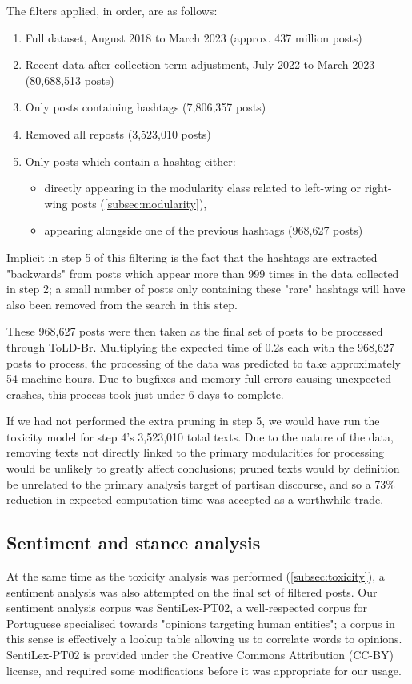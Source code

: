 \documentclass[a4paper,11pt]{article}  %
\begin{document}
	The filters applied, in order, are as follows:
	\begin{enumerate}
		\item Full dataset, August 2018 to March 2023 (approx. 437 million posts)
		\item Recent data after collection term adjustment, July 2022 to March 2023 (80,688,513 posts)
		\item Only posts containing hashtags (7,806,357 posts)
		\item Removed all reposts (3,523,010 posts)
		\item Only posts which contain a hashtag either:
		\begin{itemize}
			\item directly appearing in the modularity class related to left-wing or right-wing posts (\autoref{subsec:modularity}),
			\item appearing alongside one of the previous hashtags (968,627 posts)
		\end{itemize}
	\end{enumerate}
	Implicit in step 5 of this filtering is the fact that the hashtags are extracted "backwards" from posts which appear more than 999 times in the data collected in step 2; a small number of posts only containing these "rare" hashtags will have also been removed from the search in this step.
	
	These 968,627 posts were then taken as the final set of posts to be processed through ToLD-Br. Multiplying the expected time of 0.2s each with the 968,627 posts to process, the processing of the data was predicted to take approximately 54 machine hours. Due to bugfixes and memory-full errors causing unexpected crashes, this process took just under 6 days to complete.
	
	If we had not performed the extra pruning in step 5, we would have run the toxicity model for step 4's 3,523,010 total texts. Due to the nature of the data, removing texts not directly linked to the primary modularities for processing would be unlikely to greatly affect conclusions; pruned texts would by definition be unrelated to the primary analysis target of partisan discourse, and so a 73\% reduction in expected computation time was accepted as a worthwhile trade.

	\subsection{Sentiment and stance analysis}
	\label{subsec:sentiment}
	At the same time as the toxicity analysis was performed (\autoref{subsec:toxicity}), a sentiment analysis was also attempted on the final set of filtered posts. Our sentiment analysis corpus was SentiLex-PT02, a well-respected corpus for Portuguese specialised towards "opinions targeting human entities"\parencite{carvalhoSentiLexPT021970}; a corpus in this sense is effectively a lookup table allowing us to correlate words to opinions. SentiLex-PT02 is provided under the Creative Commons Attribution (CC-BY) license, and required some modifications before it was appropriate for our usage.
\end{document}
